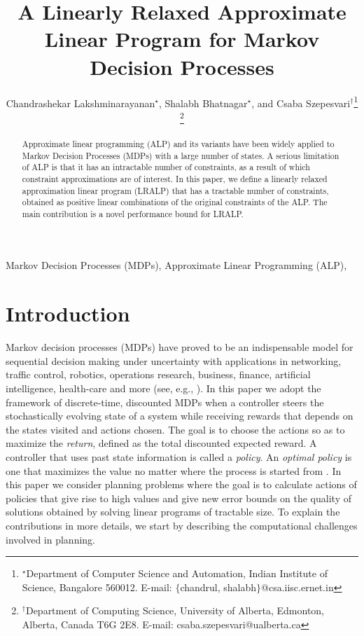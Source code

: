 \documentclass[12pt,draftcls,onecolumn]{IEEEtran}
\title{A Linearly Relaxed Approximate Linear Program for Markov Decision Processes}
\author{Chandrashekar Lakshminarayanan$^\star$, Shalabh Bhatnagar$^\star$,
 and Csaba Szepesvari$^\dagger$\thanks{$^\star$Department of Computer
Science and Automation, Indian Institute of Science, Bangalore 560012.
E-mail: $\{$chandrul, shalabh$\}$@csa.iisc.ernet.in}
\thanks{$^\dagger$Department of Computing Science, University of Alberta,
Edmonton, Alberta, Canada T6G 2E8. E-mail: csaba.szepesvari@ualberta.ca}}
\begin{document}
\maketitle

\begin{abstract}
Approximate linear programming (ALP) and its variants have been widely applied to Markov Decision Processes (MDPs) with a large number of states. A serious limitation of ALP is that it has an intractable number of constraints, as a result of which constraint approximations are of interest. In this paper, we define a linearly relaxed approximation linear program (LRALP) that has a tractable number of constraints, obtained as positive linear combinations of the original constraints of the ALP. The main contribution is a novel performance bound for LRALP.
\end{abstract}
\begin{keywords}{
Markov Decision Processes (MDPs), Approximate Linear Programming (ALP), %
}
\end{keywords}
\section{Introduction}
Markov decision processes (MDPs) have proved to be an indispensable model for sequential decision making under uncertainty with applications in networking, traffic control, robotics, operations research, business, finance, artificial intelligence, health-care and more (see, e.g., \cite{
White93:Apps,
rust96:book,
FeiSh02:MDPHandbook,
QiWu07,
SiBu10:MDPinAI,
BauRie:11,Puter,
LeLiu12:RLBook,
Abuetal15:MDPWireless,
BouDi17:MDPPractice}).
In this paper we adopt the framework of discrete-time, discounted MDPs when
a controller steers the stochastically evolving state of a system while receiving
rewards that depends on the states visited and actions chosen. The goal is to choose the actions so as to maximize the \emph{return}, defined as the total discounted expected reward. A controller that uses past state information is called a \emph{policy}. An \emph{optimal policy} is one that maximizes the value no matter where the process is started from \cite{Puter}.
In this paper we consider planning problems where the goal is to calculate actions of policies that give rise to high values
and give new error bounds on the quality of solutions obtained by solving linear programs of tractable size.
To explain the contributions in more details, we start by describing the computational challenges involved in planning.
\end{document}
